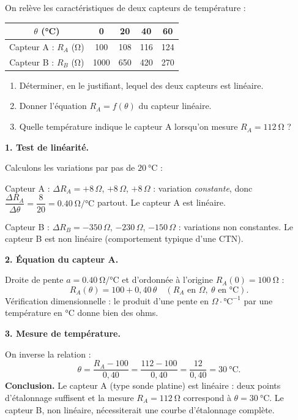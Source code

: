 \documentclass[11pt]{article}
\newcommand{\cle}[1]{{\popxbold\color{popdark}#1}}
\begin{document}
\begin{exoresolu}
On relève les caractéristiques de deux capteurs de température :

\begin{center}
\begin{tabular}{|c|c|c|c|c|}
\hline
\rowcolor{popblueL} $\theta$ (\si{\celsius}) & 0 & 20 & 40 & 60 \\
\hline
Capteur A : $R_A$ (\si{\ohm}) & 100 & 108 & 116 & 124 \\
\hline
Capteur B : $R_B$ (\si{\ohm}) & 1000 & 650 & 420 & 270 \\
\hline
\end{tabular}
\end{center}

\begin{enumerate}
\item Déterminer, en le justifiant, lequel des deux capteurs est linéaire.
\item Donner l'équation $R_A = f(\theta)$ du capteur linéaire.
\item Quelle température indique le capteur A lorsqu'on mesure $R_A = \SI{112}{\ohm}$ ?
\end{enumerate}
\tcblower
\textbf{1. Test de linéarité.}

Calculons les variations par pas de $\SI{20}{\celsius}$ :

Capteur A : $\Delta R_A = +8\,\Omega$, $+8\,\Omega$, $+8\,\Omega$ : variation \emph{constante}, donc $\dfrac{\Delta R_A}{\Delta \theta} = \dfrac{8}{20} = \SI{0,40}{\ohm\per\celsius}$ partout. Le capteur A est \cle{linéaire}.

Capteur B : $\Delta R_B = -350\,\Omega$, $-230\,\Omega$, $-150\,\Omega$ : variations non constantes. Le capteur B est \cle{non linéaire} (comportement typique d'une CTN).

\textbf{2. Équation du capteur A.}

Droite de pente $a = \SI{0,40}{\ohm\per\celsius}$ et d'ordonnée à l'origine $R_A(0) = \SI{100}{\ohm}$ :
\[
R_A(\theta) = 100 + 0{,}40\,\theta \quad (R_A \text{ en } \Omega,\ \theta \text{ en } \si{\celsius}).
\]
Vérification dimensionnelle : le produit d'une pente en $\Omega \cdot \si{\celsius}^{-1}$ par une température en $\si{\celsius}$ donne bien des ohms. \checkmark

\textbf{3. Mesure de température.}

On inverse la relation :
\[
\theta = \frac{R_A - 100}{0{,}40} = \frac{112 - 100}{0{,}40} = \frac{12}{0{,}40} = \SI{30}{\celsius}.
\]
\textbf{Conclusion.} Le capteur A (type sonde platine) est linéaire : deux points d'étalonnage suffisent et la mesure $R_A = \SI{112}{\ohm}$ correspond à $\theta = \SI{30}{\celsius}$. Le capteur B, non linéaire, nécessiterait une courbe d'étalonnage complète.
\end{exoresolu}
\end{document}
